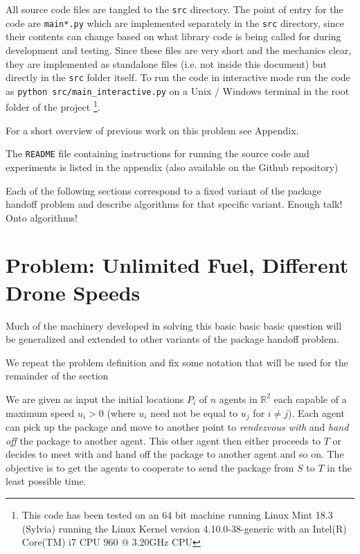 \documentclass[10pt, english, oneside]{report}
\begin{document}
All source code files are tangled to the \verb|src| directory. The point of entry for the code are 
\verb|main*.py| which are implemented separately in the \verb|src| directory, since their contents 
can change based on what library code is being called 
for during development and testing. Since these files are very short and the mechanics clear, 
they are implemented as standalone files (i.e. not inside this document) but directly in the \verb|src| folder 
itself. To run the code in interactive mode run the code as \verb|python src/main_interactive.py| on a 
Unix / Windows terminal in the root folder of the project \footnote{This code has been tested on an 64 bit 
machine running Linux Mint 18.3 (Sylvia) running the Linux Kernel version 4.10.0-38-generic with an 
Intel(R) Core(TM) i7 CPU 960 @ 3.20GHz CPU}. 

For a short overview of previous work on this problem see Appendix. 

The \verb|README| file containing instructions for running the source code and experiments is listed in the 
appendix (also available on the Github repository)

Each of the following sections correspond to a fixed variant of the package handoff problem and describe
algorithms for that specific variant. Enough talk! Onto algorithms! 

\section{Problem: Unlimited Fuel, Different Drone Speeds}

Much of the machinery developed in solving this basic basic basic question will be generalized and extended to 
other variants of the package handoff problem. 

We repeat the problem definition and fix some notation that will be used for the remainder 
of the section 

\begin{displayquote}
  We are given as input the initial locations $P_i$ of $n$  agents in $\mathbb{R}^2$ 
each capable of a maximum speed $u_i >0$ (where $u_i$ need not be equal to $u_j$ for $i \neq j$).
Each agent can pick up the package and move to another point to \textit{rendezvous with} and 
\textit{hand off} the 
package to another agent. This other agent then either proceeds to $T$ or decides to meet with 
and hand off the package to another agent and so on. 
The objective is to get the agents to cooperate to send the package from $S$ to $T$ in the 
least possible time. 
\end{displayquote}
\end{document}
